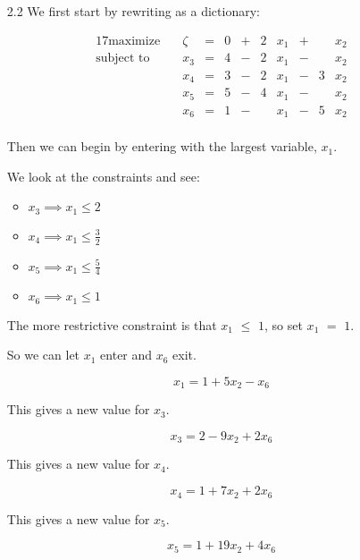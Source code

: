 \documentclass[12pt,letterpaper]{article}
\newcommand*\enterexit[2]{
  So we can let #1 enter and #2 exit.
}
\newcommand*\morerestrictive[2]{
  The more restrictive constraint is that #1 $\leq$ #2, so set #1 $=$ #2.
}
\newcommand*\newvalue[1]{
  This gives a new value for #1.
}
\begin{document}
\begin{enumerate}
      Since we have no more optimizable variables
      (all variable coefficients of $\zeta$ are non-positive),
      we can no longer maximize $\zeta$.

      Then we have an optimal solution with $x_1 = 2, x_3 = 1, x_2 = x_4 = x_5 = x_6 = 0$,
      and value 17.
    \item [2.2]
      We first start by rewriting as a dictionary:

      \begin{alignat*}{17}
        \text{maximize}   \quad & \zeta & {}={} & 0 & {}+{} & 2 & x_1 & {}+{} &   & x_2 \\
        \text{subject to} \quad & x_3   & {}={} & 4 & {}-{} & 2 & x_1 & {}-{} &   & x_2 \\
                                & x_4   & {}={} & 3 & {}-{} & 2 & x_1 & {}-{} & 3 & x_2 \\
                                & x_5   & {}={} & 5 & {}-{} & 4 & x_1 & {}-{} &   & x_2 \\
                                & x_6   & {}={} & 1 & {}-{} &   & x_1 & {}-{} & 5 & x_2 \\
      \end{alignat*}

      Then we can begin by entering with the largest variable, $x_1$.

      We look at the constraints and see:
      \begin{itemize}
        \item $x_3 \implies x_1 \leq 2$
        \item $x_4 \implies x_1 \leq \frac{3}{2}$
        \item $x_5 \implies x_1 \leq \frac{5}{4}$
        \item $x_6 \implies x_1 \leq 1$
      \end{itemize}

      \morerestrictive{$x_1$}{$1$}

      \enterexit{$x_1$}{$x_6$}

      \[
        x_1 = 1 + 5x_2 - x_6
      \]

      \newvalue{$x_3$}

      \[
        x_3 = 2 - 9x_2 + 2x_6
      \]

      \newvalue{$x_4$}

      \[
        x_4 = 1 + 7x_2 + 2x_6
      \]

      \newvalue{$x_5$}

      \[
        x_5 = 1 + 19x_2 + 4x_6
      \]


\end{enumerate}
\end{document}
